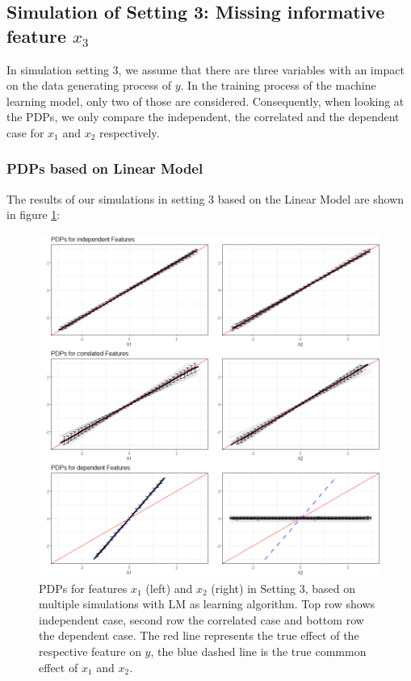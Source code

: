 \documentclass[]{krantz}
\begin{document}
\subsection{\texorpdfstring{Simulation of Setting 3: Missing informative
feature
\(x_3\)}{Simulation of Setting 3: Missing informative feature x\_3}}\label{simulation-of-setting-3-missing-informative-feature-x_3}

In simulation setting 3, we assume that there are three variables with
an impact on the data generating process of \(y\). In the training
process of the machine learning model, only two of those are considered.
Consequently, when looking at the PDPs, we only compare the independent,
the correlated and the dependent case for \(x_1\) and \(x_2\)
respectively.

\subsubsection{PDPs based on Linear
Model}\label{pdps-based-on-linear-model-1}

The results of our simulations in setting 3 based on the Linear Model
are shown in figure \ref{fig:Figure19}:

\begin{figure}

\includegraphics[width=1\linewidth]{images/VK_PDP_19_Set3_LM} \hfill{}

\caption{PDPs for features $x_1$ (left) and $x_2$  (right) in Setting 3, based on multiple simulations with LM as learning algorithm. Top row shows independent case, second row the correlated case and bottom row the dependent case. The red line represents the true effect of the respective feature on $y$, the blue dashed line is the true commmon effect of $x_1$ and $x_2$.}\label{fig:Figure19}
\end{figure}
\end{document}
